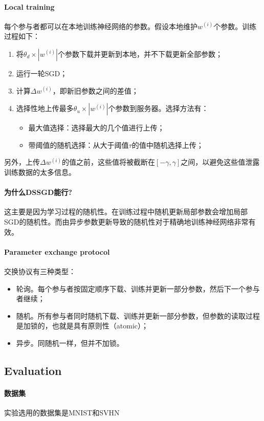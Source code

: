 \documentclass[12pt,a4paper]{article}
\begin{document}
\paragraph{Local training} 每个参与者都可以在本地训练神经网络的参数。假设本地维护$w^{(i)}$个参数。训练过程如下：
\begin{enumerate}
	\item 将$\theta_d \times |w^{(i)}|$个参数下载并更新到本地，并不下载更新全部参数；
	\item 运行一轮SGD；
	\item 计算$\Delta w^{(i)}$，即新旧参数之间的差值；
	\item 选择性地上传最多$\theta_u \times |w^{(i)}|$个参数到服务器。选择方法有：
	\begin{itemize}
		\item 最大值选择：选择最大的几个值进行上传；
		\item 带阈值的随机选择：从大于阈值$\tau$的值中随机选择上传；
	\end{itemize}
\end{enumerate}
另外，上传$\Delta w^{(i)}$的值之前，这些值将被截断在$[-\gamma, \gamma]$之间，以避免这些值泄露训练数据的太多信息。
\paragraph{为什么DSSGD能行?} 这主要是因为学习过程的随机性。在训练过程中随机更新局部参数会增加局部SGD的随机性。而由异步参数更新导致的随机性对于精确地训练神经网络非常有效。
\paragraph{Parameter exchange protocol} 交换协议有三种类型：
\begin{itemize}
	\item 轮询。每个参与者按固定顺序下载、训练并更新一部分参数，然后下一个参与者继续；
	\item 随机。所有参与者同时随机下载、训练并更新一部分参数，但参数的读取过程是加锁的，也就是具有原则性（atomic）；
	\item 异步。同随机一样，但并不加锁。
\end{itemize}
\subsection{Evaluation}
\paragraph{数据集} 实验选用的数据集是MNIST和SVHN
\end{document}

